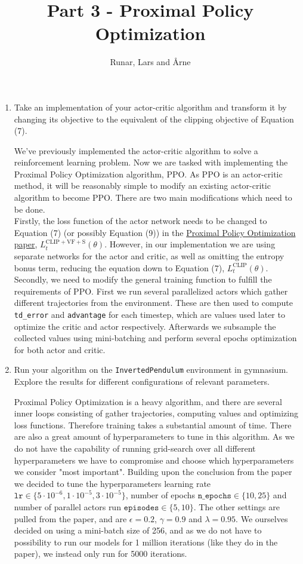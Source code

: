 \documentclass{article}
\title{\vspace{-5.0cm}Part 3 - Proximal Policy Optimization\vspace{-0.3cm}}
\author{Runar, Lars and Årne\vspace{-0.5cm}}
\date{}
\begin{document}
\maketitle
\vspace{-1.0cm}

\begin{enumerate}

\item{Take an implementation of your actor-critic algorithm and transform it by changing its objective to the equivalent of the clipping objective of Equation (7).}

We've previously implemented the actor-critic algorithm to solve a reinforcement learning problem. Now we are tasked with implementing the Proximal Policy Optimization algorithm, PPO. As PPO is an actor-critic method, it will be reasonably simple to modify an existing actor-critic algorithm to become PPO. There are two main modifications which need to be done.
\\[3pt]
Firstly, the loss function of the actor network needs to be changed to Equation (7) (or possibly Equation (9)) in the \href{https://arxiv.org/pdf/1707.06347}{Proximal Policy Optimization paper}, $L_t^{\text{CLIP}+\text{VF}+\text{S}}(\theta)$. However, in our implementation we are using separate networks for the actor and critic, as well as omitting the entropy bonus term, reducing the equation down to Equation (7), $L_t^\text{CLIP}(\theta)$.
Secondly, we need to modify the general training function to fulfill the requirements of PPO. First we run several parallelized actors which gather different trajectories from the environment. These are then used to compute \texttt{td\_error} and \texttt{advantage} for each timestep, which are values used later to optimize the critic and actor respectively. Afterwards we subsample the collected values using mini-batching and perform several epochs optimization for both actor and critic.

\item{Run your algorithm on the \texttt{InvertedPendulum} environment in gymnasium. Explore the results for different configurations of relevant parameters.}

Proximal Policy Optimization is a heavy algorithm, and there are several inner loops consisting of gather trajectories, computing values and optimizing loss functions. Therefore training takes a substantial amount of time. There are also a great amount of hyperparameters to tune in this algorithm. As we do not have the capability of running grid-search over all different hyperparameters we have to compromise and choose which hyperparameters we consider "most important". Building upon the conclusion from the paper we decided to tune the hyperparameters learning rate $\texttt{lr} \in \{5\cdot10^{-6}, 1\cdot10^{-5}, 3\cdot10^{-5}\}$, number of epochs $\texttt{n\_epochs} \in \{10, 25\}$ and number of parallel actors run $\texttt{episodes} \in \{5, 10\}$. The other settings are pulled from the paper, and are $\epsilon = 0.2$, $\gamma=0.9$ and $\lambda=0.95$. We ourselves decided on using a mini-batch size of 256, and as we do not have to possibility to run our models for 1 million iterations (like they do in the paper), we instead only run for 5000 iterations.


\end{enumerate}
\end{document}
